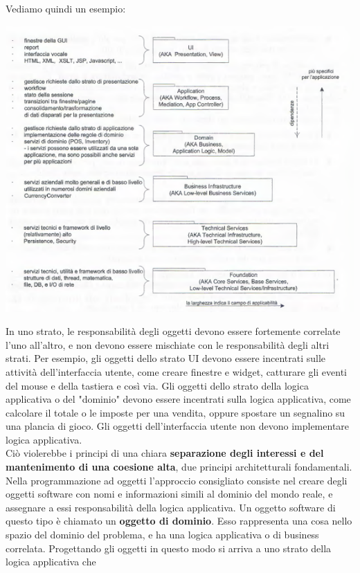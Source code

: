 \documentclass[a4paper,12pt, oneside]{book}
\begin{document}
Vediamo quindi un esempio:
\begin{center}
\includegraphics[scale = 0.7]{img/log4.png}
\end{center}
In uno strato, le responsabilità degli oggetti devono essere fortemente correlate l'uno all'altro, e non devono essere mischiate con le responsabilità degli altri strati. Per esempio,
gli oggetti dello strato UI devono essere incentrati sulle attività dell'interfaccia utente,
come creare finestre e widget, catturare gli eventi del mouse e della tastiera e così via. Gli
oggetti dello strato della logica applicativa o del "dominio" devono essere incentrati sulla
logica applicativa, come calcolare il totale o le imposte per una vendita, oppure spostare
un segnalino su una plancia di gioco.
Gli oggetti dell'interfaccia utente non devono implementare logica applicativa.\\
Ciò violerebbe
i principi di una chiara \textbf{separazione degli interessi e del mantenimento di una coesione
  alta}, due principi architetturali fondamentali.\\
Nella programmazione ad oggetti l'approccio consigliato consiste nel creare degli
oggetti software con nomi e informazioni simili al dominio del mondo reale, e assegnare
a essi responsabilità della logica applicativa. Un oggetto
software di questo tipo è chiamato un \textbf{oggetto di dominio}. Esso rappresenta una cosa
nello spazio del dominio del problema, e ha una logica applicativa o di business correlata. Progettando gli oggetti in questo modo si arriva a uno strato della logica applicativa che
\end{document}
